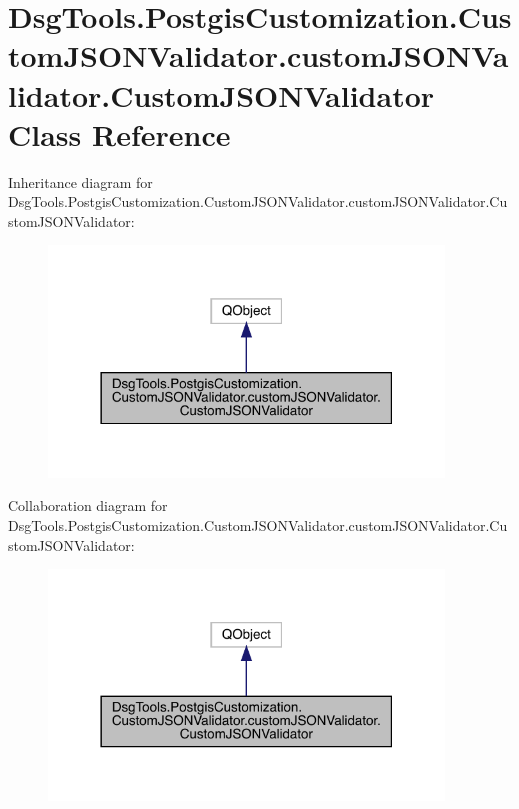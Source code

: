 \hypertarget{class_dsg_tools_1_1_postgis_customization_1_1_custom_j_s_o_n_validator_1_1custom_j_s_o_n_validator_1_1_custom_j_s_o_n_validator}{}\section{Dsg\+Tools.\+Postgis\+Customization.\+Custom\+J\+S\+O\+N\+Validator.\+custom\+J\+S\+O\+N\+Validator.\+Custom\+J\+S\+O\+N\+Validator Class Reference}
\label{class_dsg_tools_1_1_postgis_customization_1_1_custom_j_s_o_n_validator_1_1custom_j_s_o_n_validator_1_1_custom_j_s_o_n_validator}


Inheritance diagram for Dsg\+Tools.\+Postgis\+Customization.\+Custom\+J\+S\+O\+N\+Validator.\+custom\+J\+S\+O\+N\+Validator.\+Custom\+J\+S\+O\+N\+Validator\+:
\nopagebreak
\begin{figure}[H]
\begin{center}
\leavevmode
\includegraphics[width=298pt]{class_dsg_tools_1_1_postgis_customization_1_1_custom_j_s_o_n_validator_1_1custom_j_s_o_n_validata35eef998b27bc12e64f484b090d857f}
\end{center}
\end{figure}


Collaboration diagram for Dsg\+Tools.\+Postgis\+Customization.\+Custom\+J\+S\+O\+N\+Validator.\+custom\+J\+S\+O\+N\+Validator.\+Custom\+J\+S\+O\+N\+Validator\+:
\nopagebreak
\begin{figure}[H]
\begin{center}
\leavevmode
\includegraphics[width=298pt]{class_dsg_tools_1_1_postgis_customization_1_1_custom_j_s_o_n_validator_1_1custom_j_s_o_n_validatadb14ff6d133b97af44b78b025703af2}
\end{center}
\end{figure}
